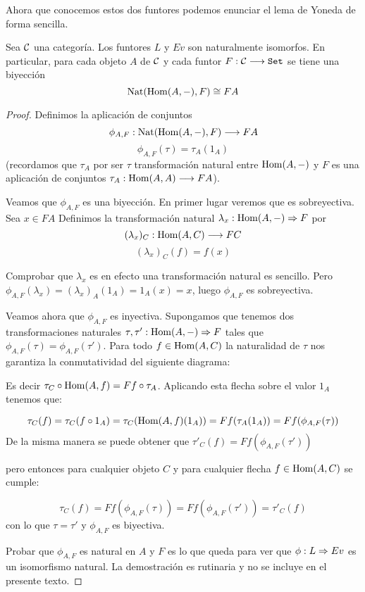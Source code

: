 Ahora que conocemos estos dos funtores podemos enunciar el lema
de Yoneda de forma sencilla.

\begin{theorem}
  Sea $\mathcal{C}$ una categoría. Los funtores $L$ y $Ev$ son naturalmente isomorfos.
  En particular, para cada objeto $A$ de $\mathcal{C}$ y cada funtor $F : \mathcal{C}\longrightarrow \texttt{Set}$
  se tiene una biyección
  $$\operatorname{Nat}(\operatorname{Hom}(A, -), F) \cong FA$$
\end{theorem}
\begin{proof}
  Definimos la aplicación de conjuntos
  $$\phi_{A, F} : \operatorname{Nat}(\operatorname{Hom}(A, -), F)\longrightarrow FA$$
  $$\phi_{A, F}(\tau) = \tau_A (1_A)$$
  (recordamos que $\tau_A$ por ser $\tau$ transformación natural entre $\operatorname{Hom}(A, -)$ y $F$ es
  una aplicación de conjuntos $\tau_A : \operatorname{Hom}(A, A)\longrightarrow F A$).

  Veamos que $\phi_{A, F}$ es una biyección. En primer lugar veremos que es sobreyectiva. Sea $x \in FA$
  Definimos la transformación natural $\lambda_x : \operatorname{Hom}(A, -)\Rightarrow F$ por
  $$(\lambda_x)_C : \operatorname{Hom}(A, C)\longrightarrow F C$$
  $$(\lambda_x)_C(f) = f(x)$$

  Comprobar que $\lambda_x$ es en efecto una transformación natural es sencillo. Pero
  $\phi_{A, F}(\lambda_x) = (\lambda_x)_A (1_A) = 1_A(x) = x$, luego $\phi_{A, F}$
  es sobreyectiva.

  Veamos ahora que $\phi_{A, F}$ es inyectiva. Supongamos que tenemos
  dos transformaciones naturales $\tau, \tau' : \operatorname{Hom}(A, -)\Rightarrow F$
  tales que $\phi_{A, F}(\tau) = \phi_{A, F}(\tau')$. Para todo $f \in \operatorname{Hom}(A, C)$
  la naturalidad de $\tau$ nos garantiza la conmutatividad
  del siguiente diagrama:

  \begin{center}
  \end{center}


  Es decir $\tau_C \circ \operatorname{Hom}(A, f) = F f \circ \tau_A$. Aplicando
  esta flecha sobre el valor $1_A$ tenemos que:

  $$\tau_C(f) = \tau_C(f \circ 1_A) = \tau_C(\operatorname{Hom}(A, f)(1_A)) = F f(\tau_A(1_A)) = Ff(\phi_{A, F}(\tau))$$
  De la misma manera se puede obtener que $\tau'_C(f)  = Ff(\phi_{A, F}(\tau'))$

  pero entonces para cualquier objeto $C$ y para cualquier flecha $f \in \operatorname{Hom}(A, C)$
  se cumple:

  $$\tau_C(f) = Ff (\phi_{A,F}(\tau)) = Ff(\phi_{A, F}(\tau')) = \tau'_C(f)$$
  con lo que $\tau = \tau'$ y $\phi_{A, F}$ es biyectiva.


  Probar que $\phi_{A, F}$ es natural en $A$ y $F$ es lo que queda para ver
  que $\phi : L\Rightarrow Ev$ es un isomorfismo natural. La demostración es
  rutinaria y no se incluye en el presente texto.
\end{proof}
